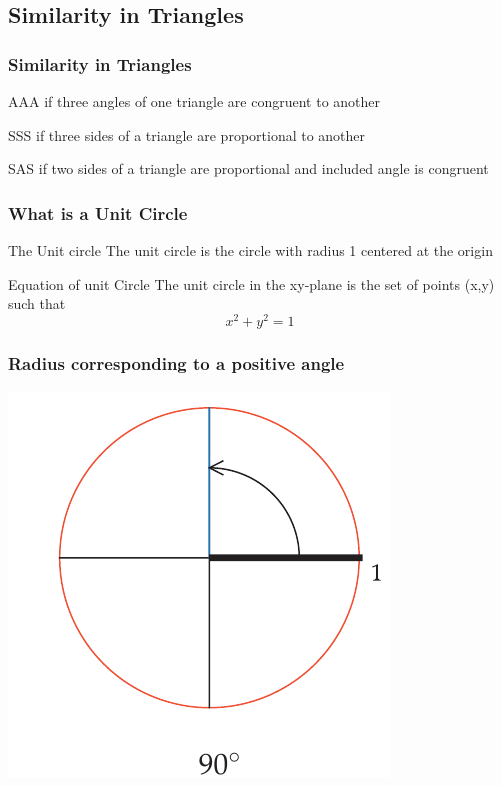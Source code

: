 \documentclass{beamer}
\begin{document}
     \subsection{Similarity in Triangles}
        \begin{frame}
            \frametitle{Similarity in Triangles}
            \begin{block}{AAA}
                if three angles of one triangle are congruent to another 
            \end{block}
            \begin{block}{SSS}
                if three sides of a triangle are proportional to another
            \end{block}
            \begin{block}{SAS}
                if two sides of a triangle are proportional and included angle is congruent 
            \end{block}
        \end{frame}

\begin{frame}
    \frametitle{What is a Unit Circle}
    \begin{block}{The Unit circle}
        The unit circle is the circle with radius 1 centered at the origin 
    \end{block}
    \begin{block}{Equation of unit Circle}
        The unit circle in the xy-plane is the set of points (x,y) such that
        $$x^{2} + y^{2} = 1$$
        
    \end{block}
    
    \end{frame}
    
    \begin{frame}
        \frametitle{Radius corresponding to a positive angle}
        \centering
        \includegraphics[scale=0.5]{1.png}
    
    \end{frame}
    
\end{document}
